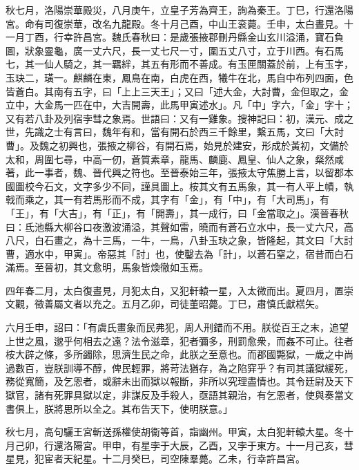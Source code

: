 \begin{pinyinscope}
秋七月，洛陽崇華殿災，八月庚午，立皇子芳為齊王，詢為秦王。丁巳，行還洛陽宮。命有司復崇華，改名九龍殿。冬十月己酉，中山王衮薨。壬申，太白晝見。十一月丁酉，行幸許昌宮。魏氏春秋曰：是歲張掖郡刪丹縣金山玄川溢涌，寶石負圖，狀象靈龜，廣一丈六尺，長一丈七尺一寸，圍五丈八寸，立于川西。有石馬七，其一仙人騎之，其一羈絆，其五有形而不善成。有玉匣關蓋於前，上有玉字，玉玦二，璜一。麒麟在東，鳳鳥在南，白虎在西，犧牛在北，馬自中布列四面，色皆蒼白。其南有五字，曰「上上三天王」；又曰「述大金，大討曹，金但取之，金立中，大金馬一匹在中，大吉開壽，此馬甲寅述水」。凡「中」字六，「金」字十；又有若八卦及列宿孛彗之象焉。世語曰：又有一雞象。搜神記曰：初，漢元、成之世，先識之士有言曰，魏年有和，當有開石於西三千餘里，繫五馬，文曰「大討曹」。及魏之初興也，張掖之柳谷，有開石焉，始見於建安，形成於黃初，文備於太和，周圍七尋，中高一仞，蒼質素章，龍馬、麟鹿、鳳皇、仙人之象，粲然咸著，此一事者，魏、晉代興之符也。至晉泰始三年，張掖太守焦勝上言，以留郡本國圖校今石文，文字多少不同，謹具圖上。桉其文有五馬象，其一有人平上幘，執戟而乘之，其一有若馬形而不成，其字有「金」，有「中」，有「大司馬」，有「王」，有「大吉」，有「正」，有「開壽」，其一成行，曰「金當取之」。漢晉春秋曰：氐池縣大柳谷口夜激波涌溢，其聲如雷，曉而有蒼石立水中，長一丈六尺，高八尺，白石畫之，為十三馬，一牛，一鳥，八卦玉玦之象，皆隆起，其文曰「大討曹，適水中，甲寅」。帝惡其「討」也，使鑿去為「計」，以蒼石窒之，宿昔而白石滿焉。至晉初，其文愈明，馬象皆煥徹如玉焉。

四年春二月，太白復晝見，月犯太白，又犯軒轅一星，入太微而出。夏四月，置崇文觀，徵善屬文者以充之。五月乙卯，司徒董昭薨。丁巳，肅慎氏獻楛矢。

六月壬申，詔曰：「有虞氏畫象而民弗犯，周人刑錯而不用。朕從百王之末，追望上世之風，邈乎何相去之遠？法令滋章，犯者彌多，刑罰愈衆，而姦不可止。往者桉大辟之條，多所蠲除，思濟生民之命，此朕之至意也。而郡國斃獄，一歲之中尚過數百，豈朕訓導不醇，俾民輕罪，將苛法猶存，為之陷穽乎？有司其議獄緩死，務從寬簡，及乞恩者，或辭未出而獄以報斷，非所以究理盡情也。其令廷尉及天下獄官，諸有死罪具獄以定，非謀反及手殺人，亟語其親治，有乞恩者，使與奏當文書俱上，朕將思所以全之。其布告天下，使明朕意。」

秋七月，高句驪王宮斬送孫權使胡衞等首，詣幽州。甲寅，太白犯軒轅大星。冬十月己卯，行還洛陽宮。甲申，有星孛于大辰，乙酉，又孛于東方。十一月己亥，彗星見，犯宦者天紀星。十二月癸巳，司空陳羣薨。乙未，行幸許昌宮。


\end{pinyinscope}
